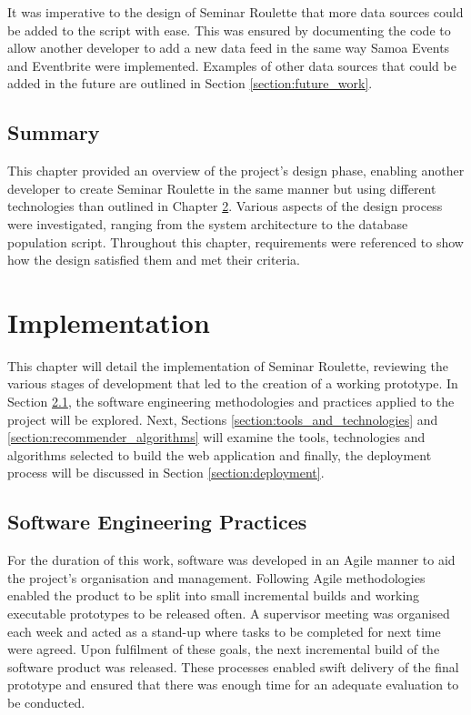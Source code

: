 \documentclass{l4proj}
\begin{document}
It was imperative to the design of Seminar Roulette that more data sources could be added to the script with ease. This was ensured by documenting the code to allow another developer to add a new data feed in the same way Samoa Events and Eventbrite were implemented. Examples of other data sources that could be added in the future are outlined in Section \ref{section:future_work}.

\section{Summary}

This chapter provided an overview of the project's design phase, enabling another developer to create Seminar Roulette in the same manner but using different technologies than outlined in Chapter \ref{chapter:implementation}. Various aspects of the design process were investigated, ranging from the system architecture to the database population script. Throughout this chapter, requirements were referenced to show how the design satisfied them and met their criteria.

\chapter{Implementation}
\label{chapter:implementation}

This chapter will detail the implementation of Seminar Roulette, reviewing the various stages of development that led to the creation of a working prototype. In Section \ref{section:software_engineering_practices}, the software engineering methodologies and practices applied to the project will be explored. Next, Sections \ref{section:tools_and_technologies} and \ref{section:recommender_algorithms} will examine the tools, technologies and algorithms selected to build the web application and finally, the deployment process will be discussed in Section \ref{section:deployment}. 

\section{Software Engineering Practices}
\label{section:software_engineering_practices}

For the duration of this work, software was developed in an Agile manner to aid the project's organisation and management. Following Agile methodologies enabled the product to be split into small incremental builds and working executable prototypes to be released often. A supervisor meeting was organised each week and acted as a stand-up where tasks to be completed for next time were agreed. Upon fulfilment of these goals, the next incremental build of the software product was released. These processes enabled swift delivery of the final prototype and ensured that there was enough time for an adequate evaluation to be conducted.
\end{document}
